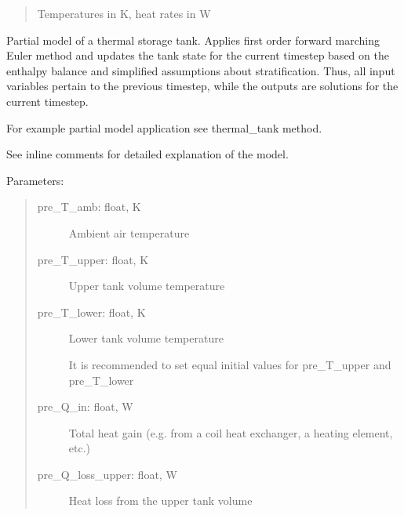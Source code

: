 \documentclass[letterpaper,10pt,english,openany]{sphinxmanual}
\begin{document}
\begin{fulllineitems}
\begin{fulllineitems}
\begin{quote}
\begin{description}
\begin{description}
Temperatures in K, heat rates in W

\end{description}

\end{description}
\end{quote}

\end{fulllineitems}


\begin{fulllineitems}
\label{\detokenize{source/mswh.system:mswh.system.components.Storage.thermal_tank_dynamics}}
Partial model of a thermal storage tank.
Applies first order forward marching Euler method and updates
the tank state for the current timestep
based on the enthalpy balance and simplified
assumptions about stratification. Thus, all
input variables pertain to the previous timestep,
while the outputs are solutions for the current timestep.

For example partial model application see thermal\_tank method.

See inline comments for detailed explanation of the model.

Parameters:
\begin{quote}
\begin{description}
\item[{pre\_T\_amb: float, K}] \leavevmode
Ambient air temperature

\item[{pre\_T\_upper: float, K}] \leavevmode
Upper tank volume temperature

\item[{pre\_T\_lower: float, K}] \leavevmode
Lower tank volume temperature

It is recommended to set equal initial values
for pre\_T\_upper and pre\_T\_lower

\item[{pre\_Q\_in: float, W}] \leavevmode
Total heat gain (e.g. from a coil heat exchanger,
a heating element, etc.)

\item[{pre\_Q\_loss\_upper: float, W}] \leavevmode
Heat loss from the upper tank volume


\end{description}
\end{quote}
\end{fulllineitems}
\end{fulllineitems}
\end{document}
